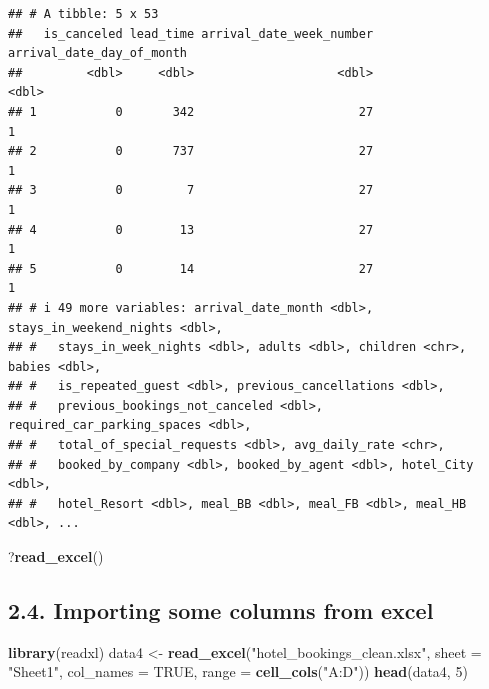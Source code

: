 \documentclass[
]{article}
\newenvironment{Shaded}{\begin{snugshade}}{\end{snugshade}}
\newcommand{\AttributeTok}[1]{\textcolor[rgb]{0.13,0.29,0.53}{#1}}
\newcommand{\ConstantTok}[1]{\textcolor[rgb]{0.56,0.35,0.01}{#1}}
\newcommand{\DecValTok}[1]{\textcolor[rgb]{0.00,0.00,0.81}{#1}}
\newcommand{\FunctionTok}[1]{\textcolor[rgb]{0.13,0.29,0.53}{\textbf{#1}}}
\newcommand{\NormalTok}[1]{#1}
\newcommand{\OtherTok}[1]{\textcolor[rgb]{0.56,0.35,0.01}{#1}}
\newcommand{\StringTok}[1]{\textcolor[rgb]{0.31,0.60,0.02}{#1}}
\begin{document}
\begin{verbatim}
## # A tibble: 5 x 53
##   is_canceled lead_time arrival_date_week_number arrival_date_day_of_month
##         <dbl>     <dbl>                    <dbl>                     <dbl>
## 1           0       342                       27                         1
## 2           0       737                       27                         1
## 3           0         7                       27                         1
## 4           0        13                       27                         1
## 5           0        14                       27                         1
## # i 49 more variables: arrival_date_month <dbl>, stays_in_weekend_nights <dbl>,
## #   stays_in_week_nights <dbl>, adults <dbl>, children <chr>, babies <dbl>,
## #   is_repeated_guest <dbl>, previous_cancellations <dbl>,
## #   previous_bookings_not_canceled <dbl>, required_car_parking_spaces <dbl>,
## #   total_of_special_requests <dbl>, avg_daily_rate <chr>,
## #   booked_by_company <dbl>, booked_by_agent <dbl>, hotel_City <dbl>,
## #   hotel_Resort <dbl>, meal_BB <dbl>, meal_FB <dbl>, meal_HB <dbl>, ...
\end{verbatim}

\begin{Shaded}
\begin{Highlighting}[]
\NormalTok{?}\FunctionTok{read\_excel}\NormalTok{()}
\end{Highlighting}
\end{Shaded}

\hypertarget{importing-some-columns-from-excel}{%
\subsection{2.4. Importing some columns from
excel}\label{importing-some-columns-from-excel}}

\begin{Shaded}
\begin{Highlighting}[]
\FunctionTok{library}\NormalTok{(readxl)}
\NormalTok{data4 }\OtherTok{\textless{}{-}} \FunctionTok{read\_excel}\NormalTok{(}\StringTok{"hotel\_bookings\_clean.xlsx"}\NormalTok{, }\AttributeTok{sheet =} \StringTok{"Sheet1"}\NormalTok{, }\AttributeTok{col\_names =} \ConstantTok{TRUE}\NormalTok{, }\AttributeTok{range =} \FunctionTok{cell\_cols}\NormalTok{(}\StringTok{"A:D"}\NormalTok{))}
\FunctionTok{head}\NormalTok{(data4, }\DecValTok{5}\NormalTok{)}
\end{Highlighting}
\end{Shaded}
\end{document}
